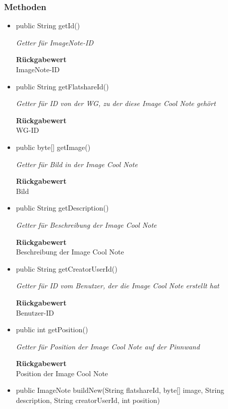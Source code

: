 \documentclass[a4paper]{scrreprt}
\begin{document}
        \subsubsection{Methoden}
        \begin{itemize}
        	\item{public String getId()}
        	
        	\textit{Getter für ImageNote-ID}
        	
        	
        	
        	\textbf{Rückgabewert} \\
        	ImageNote-ID        \item{public String getFlatshareId()}
        	
        	\textit{Getter für ID von der WG, zu der diese Image Cool Note gehört}
        	
        	
        	
        	\textbf{Rückgabewert} \\
        	WG-ID        \item{public byte[] getImage()}
        	
        	\textit{Getter für Bild in der Image Cool Note}
        	
        	
        	
        	\textbf{Rückgabewert} \\
        	Bild        \item{public String getDescription()}
        	
        	\textit{Getter für Beschreibung der Image Cool Note}
        	
        	
        	
        	\textbf{Rückgabewert} \\
        	Beschreibung der Image Cool Note        \item{public String getCreatorUserId()}
        	
        	\textit{Getter für ID vom Benutzer, der die Image Cool Note erstellt hat}
        	
        	
        	
        	\textbf{Rückgabewert} \\
        	Benutzer-ID        \item{public int getPosition()}
        	
        	\textit{Getter für Position der Image Cool Note auf der Pinnwand}
        	
        	
        	
        	\textbf{Rückgabewert} \\
        	Position der Image Cool Note        \item{public ImageNote buildNew(String flatshareId, byte[] image, String description, String creatorUserId, int position)}
        	

\end{itemize}
\end{document}
